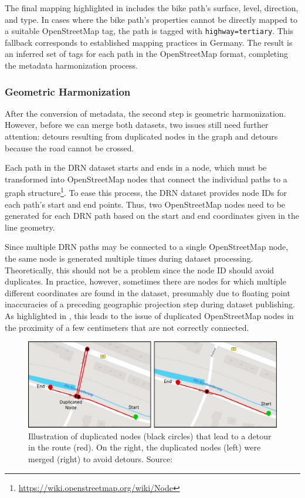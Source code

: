 The final mapping highlighted in  includes the bike path's surface, level, direction, and type. In cases where the bike path's properties cannot be directly mapped to a suitable OpenStreetMap tag, the path is tagged with \texttt{highway=tertiary}. This fallback corresponds to established mapping practices in Germany. The result is an inferred set of tags for each path in the OpenStreetMap format, completing the metadata harmonization process.

\subsubsection{Geometric Harmonization}\label{sec:maxlorenz2}

After the conversion of metadata, the second step is geometric harmonization. However, before we can merge both datasets, two issues still need further attention: detours resulting from duplicated nodes in the graph and detours because the road cannot be crossed. 

Each path in the DRN dataset starts and ends in a node, which must be transformed into OpenStreetMap nodes that connect the individual paths to a graph structure\footnote{\url{https://wiki.openstreetmap.org/wiki/Node}}. To ease this process, the DRN dataset provides node IDs for each path's start and end points. Thus, two OpenStreetMap nodes need to be generated for each DRN path based on the start and end coordinates given in the line geometry. 

Since multiple DRN paths may be connected to a single OpenStreetMap node, the same node is generated multiple times during dataset processing. Theoretically, this should not be a problem since the node ID should avoid duplicates. In practice, however, sometimes there are nodes for which multiple different coordinates are found in the dataset, presumably due to floating point inaccuracies of a preceding geographic projection step during dataset publishing. As highlighted in , this leads to the issue of duplicated OpenStreetMap nodes in the proximity of a few centimeters that are not correctly connected.

\begin{figure}[t]
\centering
\includegraphics[width=\linewidth]{images/node-merging.pdf}
\caption{Illustration of duplicated nodes (black circles) that lead to a detour in the route (red). On the right, the duplicated nodes (left) were merged (right) to avoid detours. Source: \cite{lorenz_2022}}
\label{fig:node-merging}
\end{figure}

